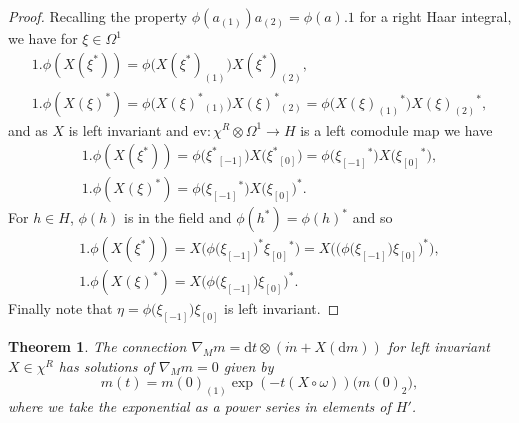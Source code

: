 \documentclass[pdftex]{sigma}
\numberwithin{equation}{section}
\newtheorem{Theorem}{Theorem}[section]
\newcommand{\ev}{\mathrm{ev}}
\newcommand{\extd}{\mathrm{d}}
\newcommand{\tens}{\mathop{\otimes}}
\newcommand{\<}{\langle}
\renewcommand{\>}{\rangle}
\begin{document}
\begin{proof}
	Recalling the property $ \phi (a_{(1)}) a_{(2)}=\phi (a).1$ for a right Haar integral, we have for $ \xi \in \Omega^{1} $
	\begin{gather*}
		1. \phi (X(\xi ^{*}))= \phi \big(X(\xi ^{*})_{(1)}\big) X(\xi ^{*})_{(2)},\\
			1. \phi (X(\xi )^{*})= \phi \big(X(\xi )^{*}{}_{(1)}\big) X(\xi )^{*}{}_{(2)}= \phi \big(X(\xi )_{(1)}{}^{*}\big) X(\xi )_{(2)}{}^{*},
	\end{gather*}
and as $ X $ is left invariant and $ \ev\colon \chi^{R} \tens \Omega^{1}\rightarrow H$ is a left comodule map we have
\begin{gather*}
	1. \phi (X(\xi ^{*}))= \phi \big(\xi ^{*}{}_{[-1]}\big) X\big(\xi ^{*}{}_{[0]}\big)	= \phi \big(\xi _{[-1]}{}^{*}\big) X\big(\xi _{[0]}{}^{*}\big),\\
		1. \phi (X(\xi )^{*})= \phi \big(\xi _{[-1]}{}^{*}\big) X\big(\xi _{[0]}\big)^{*}.
\end{gather*}
For $ h \in H $, $ \phi(h) $ is in the field and $ \phi(h^{*}) =\phi(h)^{*}$ and so
\begin{gather*}
	1. \phi (X(\xi ^{*}))= X\big(\phi \big(\xi _{[-1]}\big)^{*}\xi _{[0]}{}^{*}\big)= X\big(\big(\phi \big(\xi _{[-1]}\big)\xi _{[0]}\big)^{*}\big), \\
	1. \phi (X(\xi )^{*})= X\big(\phi \big(\xi _{[-1]}\big)\xi _{[0]}\big)^{*}.
\end{gather*}
Finally note that $ \eta=\phi\big(\xi_{[-1]}\big) \xi_{[0]}$ is left invariant.
\end{proof}
\begin{Theorem}\label{prp2tothm}
		The connection $ \nabla_{M} m= \extd t \tens (\dot{m}+X (\extd m )) $ for left invariant $ X\in \chi^{R} $ has solutions of $ \nabla_{M} m=0 $ given by
	\[m(t)=m(0)_{(1)} \exp(-t( X\circ \omega))\big(m(0)_{2}\big),\]
	where we take the exponential as a power series in elements of $H'$.
\end{Theorem}
\end{document}
